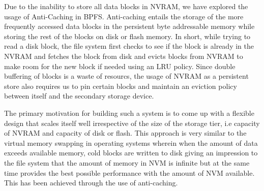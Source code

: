 Due to the inability to store all data blocks in NVRAM, we have explored the usage of Anti-Caching \cite{c13} in BPFS. Anti-caching entails the storage of the more frequently accessed data blocks in the persistent byte addressable memory while storing the rest of the blocks on disk or flash memory. In short, while trying to read a disk block, the file system first checks to see if the block is already in the NVRAM and fetches the block from disk and evicts blocks from NVRAM to make room for the new block if needed using an LRU policy. Since double buffering of blocks is a waste of resourcs, the usage of NVRAM as a persistent store also requires us to pin certain blocks and maintain an eviction policy between itself and the secondary storage device.

The primary motivation for building such a system is to come up with a flexible design that scales itself well irrespective of the size of the storage tier, i.e capacity of NVRAM and capacity of disk or flash. This approach is very similar to the virtual memory swapping in operating systems wherein when the amount of data exceeds available memory, cold blocks are written to disk giving an impression to the file system that the amount of memory in NVM is infinite but at the same time provides the best possible performance with the amount of NVM available. This has been achieved through the use of anti-caching.
